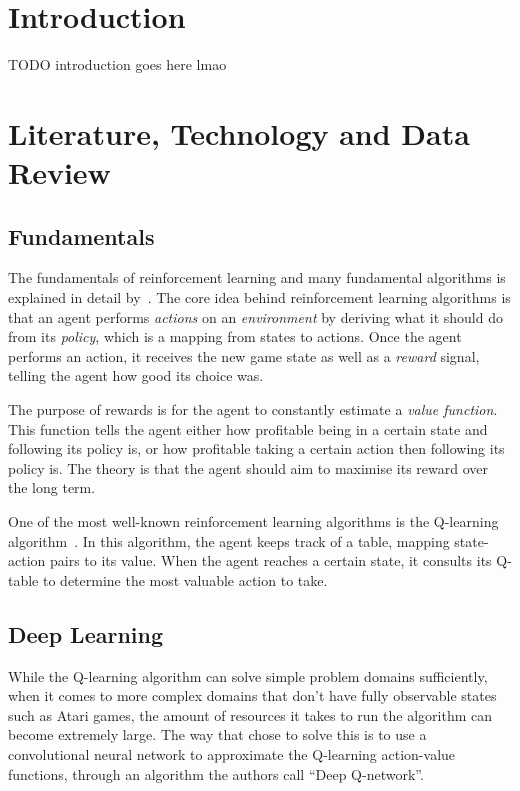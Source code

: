 \documentclass[12pt,a4paper]{article}
\begin{document}
    \newpage


    \section{Introduction}\label{sec:introduction}
    TODO introduction goes here lmao

    \section{Literature, Technology and Data Review}\label{sec:literature-technology-and-data-review}

    \subsection{Fundamentals}\label{subsec:fundamentals}

    The fundamentals of reinforcement learning and many fundamental algorithms is explained in detail by~\citet{sutton18}.
    The core idea behind reinforcement learning algorithms is that an agent performs \emph{actions} on an \emph{environment} by deriving what it should do from its \emph{policy}, which is a mapping from states to actions.
    Once the agent performs an action, it receives the new game state as well as a \emph{reward} signal, telling the agent how good its choice was.

    The purpose of rewards is for the agent to constantly estimate a \emph{value function}.
    This function tells the agent either how profitable being in a certain state and following its policy is, or how profitable taking a certain action then following its policy is.
    The theory is that the agent should aim to maximise its reward over the long term.

    One of the most well-known reinforcement learning algorithms is the Q-learning algorithm~\citep[chap.~6.5]{sutton18}.
    In this algorithm, the agent keeps track of a table, mapping state-action pairs to its value.
    When the agent reaches a certain state, it consults its Q-table to determine the most valuable action to take.

    \subsection{Deep Learning}\label{subsec:deep-learning}
    While the Q-learning algorithm can solve simple problem domains sufficiently, when it comes to more complex domains that don't have fully observable states such as Atari games, the amount of resources it takes to run the algorithm can become extremely large.
    The way that \citet{mnih15} chose to solve this is to use a convolutional neural network to approximate the Q-learning action-value functions, through an algorithm the authors call ``Deep Q-network''.
\end{document}
